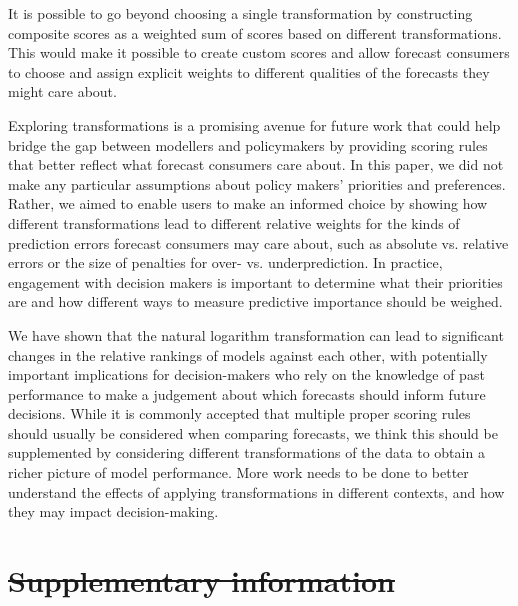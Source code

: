 \documentclass[10pt,letterpaper]{article} %
\providecommand{\DIFaddtex}[1]{{\protect\color{blue}\uwave{#1}}} %
\providecommand{\DIFdeltex}[1]{{\protect\color{red}\sout{#1}}}                      %
\providecommand{\DIFaddbegin}{} %
\providecommand{\DIFaddend}{} %
\providecommand{\DIFdelbegin}{} %
\providecommand{\DIFdelend}{} %
\providecommand{\DIFadd}[1]{\texorpdfstring{\DIFaddtex{#1}}{#1}} %
\providecommand{\DIFdel}[1]{\texorpdfstring{\DIFdeltex{#1}}{}} %
\newcommand{\DIFscaledelfig}{0.5}
\newlength{\DIFdelgraphicswidth} %
\newlength{\DIFdelgraphicsheight} %
\newcommand{\DIFaddincludegraphics}[2][]{{\color{blue}\fbox{\DIFOincludegraphics[#1]{#2}}}} %
\newcommand{\DIFdelincludegraphics}[2][]{%
\sbox{\DIFdelgraphicsbox}{\DIFOincludegraphics[#1]{#2}}%
\settoboxwidth{\DIFdelgraphicswidth}{\DIFdelgraphicsbox} %
\settoboxtotalheight{\DIFdelgraphicsheight}{\DIFdelgraphicsbox} %
\scalebox{\DIFscaledelfig}{%
\parbox[b]{\DIFdelgraphicswidth}{\usebox{\DIFdelgraphicsbox}\\[-\baselineskip] \rule{\DIFdelgraphicswidth}{0em}}\llap{\resizebox{\DIFdelgraphicswidth}{\DIFdelgraphicsheight}{%
\setlength{\unitlength}{\DIFdelgraphicswidth}%
\begin{picture}(1,1)%
\thicklines\linethickness{2pt} %
{\color[rgb]{1,0,0}\put(0,0){\framebox(1,1){}}}%
{\color[rgb]{1,0,0}\put(0,0){\line( 1,1){1}}}%
{\color[rgb]{1,0,0}\put(0,1){\line(1,-1){1}}}%
\end{picture}%
}\hspace*{3pt}}} %
} %
\DeclareRobustCommand{\DIFaddbegin}{\DIFOaddbegin \let\includegraphics\DIFaddincludegraphics} %
\DeclareRobustCommand{\DIFaddend}{\DIFOaddend \let\includegraphics\DIFOincludegraphics} %
\DeclareRobustCommand{\DIFdelbegin}{\DIFOdelbegin \let\includegraphics\DIFdelincludegraphics} %
\DeclareRobustCommand{\DIFdelend}{\DIFOaddend \let\includegraphics\DIFOincludegraphics} %
\begin{document}
It is possible to go beyond choosing a single transformation by constructing composite scores as a weighted sum of scores based on different transformations. This would make it possible to create custom scores and allow forecast consumers to choose and assign explicit weights to different qualities of the forecasts they might care about.

Exploring transformations is a promising avenue for future work that could help bridge the gap between modellers and policymakers by providing scoring rules that better reflect what forecast consumers care about. In this paper, we did not make any particular assumptions about policy makers' priorities and preferences. Rather, we aimed to enable users to make an informed choice by showing how different transformations lead to different relative weights for the kinds of prediction errors forecast consumers may care about, such as absolute vs. relative errors or the size of penalties for over- vs. underprediction. In practice, engagement with decision makers is important to determine what their priorities are and how different ways to measure predictive importance should be weighed.  

We have shown that the natural logarithm transformation can lead to significant changes in the relative rankings of models against each other, with potentially important implications for decision-makers who rely on the knowledge of past performance to make a judgement about which forecasts should inform future decisions. While it is commonly accepted that multiple proper scoring rules should usually be considered when comparing forecasts, we think this should be supplemented by considering different transformations of the data to obtain a richer picture of model performance. More work needs to be done to better understand the effects of applying transformations in different contexts, and how they may impact decision-making. 

\newpage

\appendix
\DIFdelbegin \section{\DIFdel{Supplementary information}}
\addtocounter{section}{-1}%
\DIFdelend \DIFaddbegin \section*{\DIFadd{Supplementary information}}
\DIFaddend 
\end{document}
